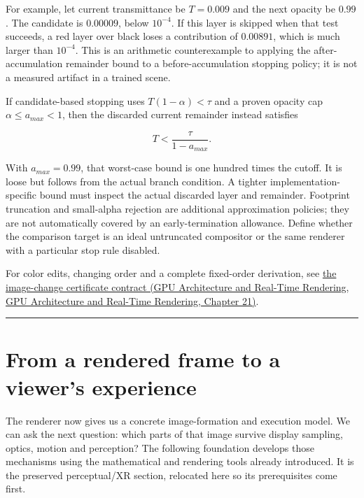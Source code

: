 For example, let current transmittance be \(T=0.009\) and the next opacity be \(0.99\). The candidate is \(0.00009\), below \(10^{-4}\). If this layer is skipped when that test succeeds, a red layer over black loses a contribution of \(0.00891\), which is much larger than \(10^{-4}\). This is an arithmetic counterexample to applying the after-accumulation remainder bound to a before-accumulation stopping policy; it is not a measured artifact in a trained scene.

If candidate-based stopping uses \(T(1-\alpha)<\tau\) and a proven opacity cap \(\alpha\le a_{max}<1\), then the discarded current remainder instead satisfies

\[
T<\frac{\tau}{1-a_{max}}.
\]

With \(a_{max}=0.99\), that worst-case bound is one hundred times the cutoff. It is loose but follows from the actual branch condition. A tighter implementation-specific bound must inspect the actual discarded layer and remainder. Footprint truncation and small-alpha rejection are additional approximation policies; they are not automatically covered by an early-termination allowance. Define whether the comparison target is an ideal untruncated compositor or the same renderer with a particular stop rule disabled.

For color edits, changing order and a complete fixed-order derivation, see \href{../06-GPU-Architecture-and-Real-Time-Rendering/main.pdf\#nameddest=06-engine-ii-ch045-an-image-change-certificate-must-name-the-edits-it-covers}{the image-change certificate contract (GPU Architecture and Real-Time Rendering, GPU Architecture and Real-Time Rendering, Chapter 21)}.

\begin{center}\rule{0.5\linewidth}{0.5pt}\end{center}

\section{From a rendered frame to a viewer's experience}\label{04-visual-computing-ii-ch041-from-a-rendered-frame-to-a-viewers-experience}

The renderer now gives us a concrete image-formation and execution model. We can ask the next question: which parts of that image survive display sampling, optics, motion and perception? The following foundation develops those mechanisms using the mathematical and rendering tools already introduced. It is the preserved perceptual/XR section, relocated here so its prerequisites come first.

